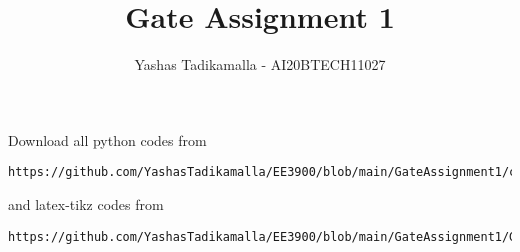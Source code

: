 \documentclass[journal,12pt,twocolumn]{IEEEtran}
\DeclareMathOperator*{\Res}{Res}
\begin{document}
\newcommand{\BEQA}{\begin{eqnarray}}
\newcommand{\EEQA}{\end{eqnarray}}
\newcommand{\define}{\stackrel{\triangle}{=}}

\raggedbottom
\setlength{\parindent}{0pt}
\providecommand{\mbf}{\mathbf}
\providecommand{\pr}[1]{\ensuremath{\Pr\left(#1\right)}}
\providecommand{\qfunc}[1]{\ensuremath{Q\left(#1\right)}}
\providecommand{\sbrak}[1]{\ensuremath{{}\left[#1\right]}}
\providecommand{\lsbrak}[1]{\ensuremath{{}\left[#1\right.}}
\providecommand{\rsbrak}[1]{\ensuremath{{}\left.#1\right]}}
\providecommand{\brak}[1]{\ensuremath{\left(#1\right)}}
\providecommand{\lbrak}[1]{\ensuremath{\left(#1\right.}}
\providecommand{\rbrak}[1]{\ensuremath{\left.#1\right)}}
\providecommand{\cbrak}[1]{\ensuremath{\left\{#1\right\}}}
\providecommand{\lcbrak}[1]{\ensuremath{\left\{#1\right.}}
\providecommand{\rcbrak}[1]{\ensuremath{\left.#1\right\}}}
\theoremstyle{remark}
\newtheorem{rem}{Remark}
\newcommand{\sgn}{\mathop{\mathrm{sgn}}}
\providecommand{\abs}[1]{\vert#1\vert}
\providecommand{\res}[1]{\Res\displaylimits_{#1}} 
\providecommand{\norm}[1]{\lVert#1\rVert}
\providecommand{\mtx}[1]{\mathbf{#1}}
\providecommand{\mean}[1]{E[ #1 ]}
\providecommand{\fourier}{\overset{\mathcal{F}}{ \rightleftharpoons}}
\providecommand{\system}{\overset{\mathcal{H}}{ \longleftrightarrow}}
\newcommand{\solution}{\noindent \textbf{Solution: }}
\newcommand{\cosec}{\,\text{cosec}\,}
\providecommand{\dec}[2]{\ensuremath{\overset{#1}{\underset{#2}{\gtrless}}}}
\newcommand{\myvec}[1]{\ensuremath{\begin{pmatrix}#1\end{pmatrix}}}
\newcommand{\mydet}[1]{\ensuremath{\begin{vmatrix}#1\end{vmatrix}}}
\makeatletter
{}
\makeatother
\let\StandardTheFigure\thefigure
\let\vec\mathbf
\renewcommand{\thefigure}{\theproblem}
\def\putbox#1#2#3{\makebox[0in][l]{\makebox[#1][l]{}\raisebox{\baselineskip}[0in][0in]{\raisebox{#2}[0in][0in]{#3}}}}
     \def\rightbox#1{\makebox[0in][r]{#1}}
     \def\centbox#1{\makebox[0in]{#1}}
     \def\topbox#1{\raisebox{-\baselineskip}[0in][0in]{#1}}
     \def\midbox#1{\raisebox{-0.5\baselineskip}[0in][0in]{#1}}
\vspace{3cm}
\title{Gate Assignment 1}
\author{Yashas Tadikamalla - AI20BTECH11027}
\maketitle
\newpage
\bigskip
\renewcommand{\thefigure}{\theenumi}
\renewcommand{\thetable}{\theenumi}
Download all python codes from 
\begin{lstlisting}
https://github.com/YashasTadikamalla/EE3900/blob/main/GateAssignment1/codes
\end{lstlisting}
%
and latex-tikz codes from 
%
\begin{lstlisting}
https://github.com/YashasTadikamalla/EE3900/blob/main/GateAssignment1/GateAssignment1.tex
\end{lstlisting}
\end{document}
